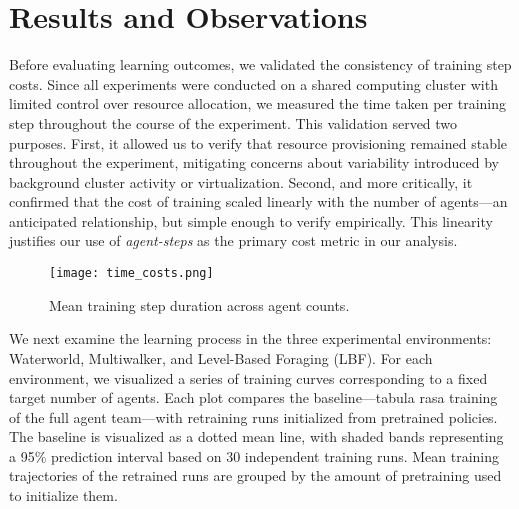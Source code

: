 \documentclass{article}
\begin{document}
        

\vspace{3em}


\section{Results and Observations}

Before evaluating learning outcomes, we validated the consistency of training step costs.
Since all experiments were conducted on a shared computing cluster with limited 
control over resource allocation, we measured the time taken per training
step throughout the course of the experiment. This validation served two purposes. First, 
it allowed us to verify that resource provisioning remained stable throughout the experiment, 
mitigating concerns about variability introduced by background cluster activity or virtualization.
Second, and more critically, it confirmed that the cost of training scaled linearly 
with the number of agents—an anticipated relationship, but simple enough to verify empirically.
This linearity justifies our use of \emph{agent-steps} as the primary cost metric in our analysis.
\begin{figure}[h]
    \centering
    \texttt{[image: time\_costs.png]}
    \caption{Mean training step duration across agent counts.}
    \label{fig:agent-steps}
\end{figure}


We next examine the learning process in the three experimental environments: 
Waterworld, Multiwalker, and Level-Based Foraging (LBF). For each environment, 
we visualized a series of training curves corresponding to a fixed target number of agents.
Each plot compares the baseline—tabula rasa training of the full agent team—with 
retraining runs initialized from pretrained policies.
The baseline is visualized as a dotted mean line, with shaded bands 
representing a 95\% prediction interval based on 30 independent training runs.
Mean training trajectories of the retrained runs are grouped by the amount 
of pretraining used to initialize them.
\end{document}
